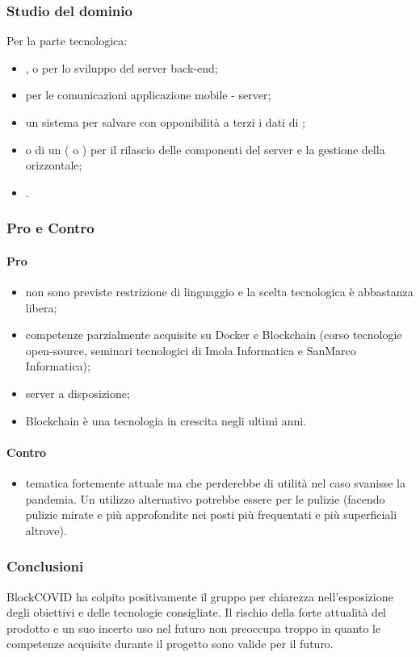 \subsubsection{Studio del dominio}
Per la parte tecnologica:
\begin{itemize}
\item {},  o  per lo sviluppo del server back-end;
\item {}  per le comunicazioni applicazione mobile - server;
\item un sistema  per salvare con opponibilità a terzi i dati di ;
\item {} o di un  ( o ) per il rilascio delle componenti del server e la gestione della  orizzontale;
\item {}.
\end{itemize}
\subsubsection{Pro e Contro}
\paragraph*{Pro}
\begin{itemize}
	\item non sono previste restrizione di linguaggio e la scelta tecnologica è abbastanza libera;
	\item competenze parzialmente acquisite su Docker e Blockchain (corso tecnologie open-source, seminari tecnologici di Imola Informatica e SanMarco Informatica);
	\item server a disposizione;
	\item Blockchain è una tecnologia in crescita negli ultimi anni.
\end{itemize}
\paragraph*{Contro}
\begin{itemize}
	\item tematica fortemente attuale ma che perderebbe di utilità nel caso svanisse la pandemia. Un utilizzo alternativo potrebbe essere per le pulizie (facendo pulizie mirate e più approfondite nei posti più frequentati e più superficiali altrove).
\end{itemize}
\subsubsection{Conclusioni}
BlockCOVID ha colpito positivamente il gruppo per chiarezza nell'esposizione degli obiettivi e delle tecnologie consigliate. Il rischio della forte attualità del prodotto e un suo incerto uso nel futuro non preoccupa troppo in quanto le competenze acquisite durante il progetto sono valide per il futuro.

